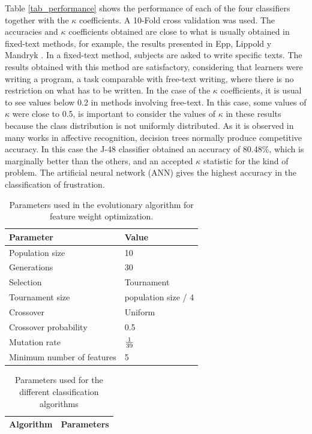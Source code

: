 \documentclass[a4paper,twoside]{article}
\begin{document}
Table \ref{tab_performance} shows the performance of each of the four
classifiers together
with the $\kappa$ coefficients. A 10-Fold cross validation was used.
The accuracies and $\kappa$ coefficients obtained are close to what is
usually obtained in fixed-text methods, for example, the results presented in
Epp, Lippold y Mandryk \cite{epp2011identifying}.
In a fixed-text method, subjects are asked to write specific texts.
The results obtained with this method are satisfactory, considering that
learners were writing a program, a task comparable with free-text writing,
where there is no restriction on what has to be written.
In the case of the $\kappa$ coefficients, it is
usual to see values below 0.2 in methods involving free-text. In this case, some
values of $\kappa$ were close to 0.5, is important to consider the values of $\kappa$
in these results because the class distribution is not uniformly distributed. As
it is observed in many works in affective recognition, decision trees normally
produce competitive accuracy. In this case the J-48 classifier obtained an
accuracy of 80.48\%, which is marginally better than the others, and an accepted $\kappa$
statistic for the kind of problem. The artificial neural network (ANN)
gives the highest
accuracy in the classification of frustration.
%
\begin{table}[h!tb]
\centering
\caption{Parameters used in the evolutionary algorithm for feature
  weight optimization.}
\label{tab_ga_w}
    \begin{tabular}{ | l | l | }
      \hline
      Parameter & Value \\
        \hline
      Population size & 10 \\
      Generations & 30 \\
      Selection & Tournament \\
      Tournament size & population size / 4 \\
      Crossover & Uniform \\
      Crossover probability & 0.5 \\
      Mutation rate & $1 \over 39$ \\
      Minimum number of features & 5 \\
        \hline
    \end{tabular}
  \end{table}
% 
\begin{table}[!t]
\centering
\caption{Parameters used for the different classification algorithms }
\label{tab_params_ml}
\label{tab_perf_flow}
    \begin{tabular}{ | l | l |  }

      Algorithm & Parameters \\
      \hline
    \end{tabular}
  \end{table}
      
\end{document}
